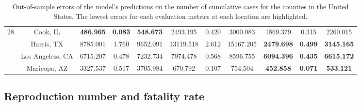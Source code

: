 \begin{landscape}
\begin{table}[!htb]
\begin{tabular}{| c | c | c | c | c | c | c | c | c | c | c |}
        \multirow{4}{*}{28}
            & Cook, IL & \textbf{486.965} & \textbf{0.083} & \textbf{548.673} & 2493.195 & 0.420 & 3000.083 & 1869.379 & 0.315 & 2260.015 \\
            & Harris, TX & 8785.001 & 1.760 & 9652.091 & 13119.518 & 2.612 & 15167.205 & \textbf{2479.698} & \textbf{0.499} & \textbf{3145.165} \\
            & Los Angeless, CA & 6715.207 & 0.478 & 7232.734 & 7974.478 & 0.568 & 8596.755 & \textbf{6094.396} & \textbf{0.435} & \textbf{6615.172} \\
            & Maricopa, AZ & 3327.537 & 0.517 & 3705.984 & 670.792 & 0.107 & 754.504 & \textbf{452.858} & \textbf{0.071} & \textbf{533.121} \\ \hline
    \end{tabular}
    \caption[Out-of-sample-errors for the number of cumulative cases for US counties]{Out-of-sample errors of the model's predictions on the number of cumulative cases for the counties in the United States. The lowest errors for each evaluation metrics at each location are highlighted.}
    \label{tab:errors-us-counties-total-cases}
\end{table}
\end{landscape}

\subsection{Reproduction number and fatality rate}

